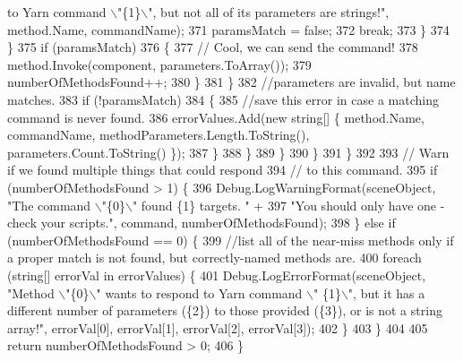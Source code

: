 \begin{DoxyCode}
{       to Yarn command \(\backslash\)"\{1\}\(\backslash\)", but not all of its parameters are strings!"}, method.Name, commandName);
371                                         paramsMatch = \textcolor{keyword}{false};
372                                         \textcolor{keywordflow}{break};
373                                     \}
374                                 \}
375                                 \textcolor{keywordflow}{if} (paramsMatch)
376                                 \{
377                                     \textcolor{comment}{// Cool, we can send the command!}
378                                     method.Invoke(component, parameters.ToArray());
379                                     numberOfMethodsFound++;
380                                 \}
381                             \}
382                             \textcolor{comment}{//parameters are invalid, but name matches.}
383                             \textcolor{keywordflow}{if} (!paramsMatch)
384                             \{
385                                 \textcolor{comment}{//save this error in case a matching command is never found.}
386                                 errorValues.Add(\textcolor{keyword}{new} \textcolor{keywordtype}{string}[] \{ method.Name, commandName, 
      methodParameters.Length.ToString(), parameters.Count.ToString() \});
387                             \}
388                         \}
389                     \}
390                 \}
391             \}
392 
393             \textcolor{comment}{// Warn if we found multiple things that could respond}
394             \textcolor{comment}{// to this command.}
395             \textcolor{keywordflow}{if} (numberOfMethodsFound > 1) \{
396                 Debug.LogWarningFormat(sceneObject, \textcolor{stringliteral}{"The command \(\backslash\)"\{0\}\(\backslash\)" found \{1\} targets. "} +
397                     \textcolor{stringliteral}{"You should only have one - check your scripts."}, command, numberOfMethodsFound);
398             \} \textcolor{keywordflow}{else} \textcolor{keywordflow}{if} (numberOfMethodsFound == 0) \{
399                 \textcolor{comment}{//list all of the near-miss methods only if a proper match is not found, but
       correctly-named methods are.}
400                 \textcolor{keywordflow}{foreach} (\textcolor{keywordtype}{string}[] errorVal \textcolor{keywordflow}{in} errorValues) \{
401                     Debug.LogErrorFormat(sceneObject, \textcolor{stringliteral}{"Method \(\backslash\)"\{0\}\(\backslash\)" wants to respond to Yarn command \(\backslash\)"
      \{1\}\(\backslash\)", but it has a different number of parameters (\{2\}) to those provided (\{3\}), or is not a string array!"}, 
      errorVal[0], errorVal[1], errorVal[2], errorVal[3]);
402                 \}
403             \}
404 
405             \textcolor{keywordflow}{return} numberOfMethodsFound > 0;
406         \}
\end{DoxyCode}
